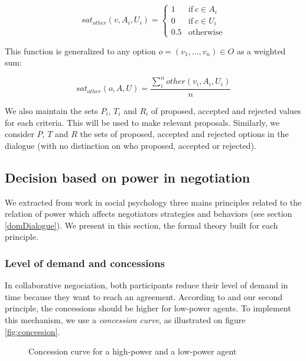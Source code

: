 \documentclass{llncs}
\begin{document}
	\begin{equation}
	sat_{other}(v, A_i, U_i)= \left\{\begin{array}{ll}
	1	 & \mathrm{if\ }  c \in A_i\\
	0    & \mathrm{if\ }c \in U_i\\
	0.5	 & \mathrm{otherwise}
	\end{array}\right.
	\end{equation}
	
	This function is generalized to any option $o=(v_1,\ldots,v_n) \in O$ as a weighted sum:
	
	\begin{equation}
	sat_{other}(o, A, U) = \frac{ \sum_{i}^{n} other(v_i, A_i, U_i) } {n}
	\end{equation}
	
	We also maintain the sets $P_i$, $T_i$ and $R_i$ of proposed, accepted and rejected values for each criteria. This will be used to make relevant proposals. Similarly, we consider $P$, $T$ and $R$ the sets of proposed, accepted and rejected options in the dialogue (with no distinction on who proposed, accepted or rejected).
	

	\subsection{Decision based on power in negotiation}
	\label{sec:decision}
	We extracted from work in social psychology three mains principles related to the relation of power which affects negotiators strategies and behaviors (see section \ref{domDialogue}). We present in this section, the formal theory built for each principle. 
	
	\subsubsection{Level of demand and concessions}
	In collaborative negociation, both participants reduce their level of demand in time because they want to reach an agreement. According to \cite{ref} and our second principle, the concessions should be higher for low-power agents. To implement this mechanism, we use a \emph{concession curve}, as illustrated on figure \ref{fig:concession}.
	
	 \begin{figure}
		\caption{Concession curve for a high-power and a low-power agent}
	 \end{figure}
	 
\end{document}

